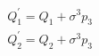 \begin{equation}
\label{24} 
\begin{array}{c}
Q_1^{\prime }=Q_1+\sigma ^3p_3 \\ 
Q_2^{\prime }=Q_2+\sigma ^3p_3 
\end{array}
\end{equation}


